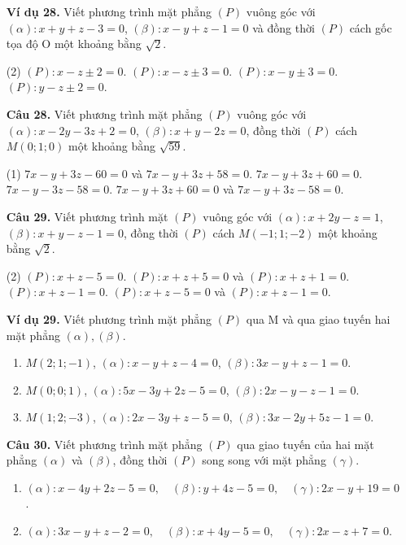 \documentclass[12pt, a4paper]{article}
\begin{document}
\begin{enumerate}[label=\textbf{\arabic*.}, wide=0pt, leftmargin=*]
    \item[\textbf{Ví dụ 28.}] Viết phương trình mặt phẳng \((P)\) vuông góc với \((\alpha): x+y+z-3=0\), \((\beta): x-y+z-1=0\) và đồng thời \((P)\) cách gốc tọa độ O một khoảng bằng \(\sqrt{2}\).
    \begin{tasks}(2)
        \task \((P): x-z \pm 2 = 0\).
        \task \((P): x-z \pm 3 = 0\).
        \task \((P): x-y \pm 3 = 0\).
        \task \((P): y-z \pm 2 = 0\).
    \end{tasks}
    
    \item[\textbf{Câu 28.}] Viết phương trình mặt phẳng \((P)\) vuông góc với \((\alpha): x-2y-3z+2=0\), \((\beta): x+y-2z=0\), đồng thời \((P)\) cách \(M(0;1;0)\) một khoảng bằng \(\sqrt{59}\).
    \begin{tasks}[label-width=1.5em](1)
        \task \(7x-y+3z-60=0\) và \(7x-y+3z+58=0\).
        \task \(7x-y+3z+60=0\).
        \task \(7x-y-3z-58=0\).
        \task \(7x-y+3z+60=0\) và \(7x-y+3z-58=0\).
    \end{tasks}
    
    
    \item[\textbf{Câu 29.}] Viết phương trình mặt \((P)\) vuông góc với \((\alpha): x+2y-z=1\), \((\beta): x+y-z-1=0\), đồng thời \((P)\) cách \(M(-1;1;-2)\) một khoảng bằng \(\sqrt{2}\).
    \begin{tasks}(2)
        \task \((P): x+z-5=0\).
        \task \((P): x+z+5=0\) và \((P): x+z+1=0\).
        \task \((P): x+z-1=0\).
        \task \((P): x+z-5=0\) và \((P): x+z-1=0\).
    \end{tasks}

    \item[\textbf{Ví dụ 29.}] Viết phương trình mặt phẳng \((P)\) qua M và qua giao tuyến hai mặt phẳng \((\alpha), (\beta)\).
    \begin{enumerate}[label=a*)]
        \item \(M(2;1;-1)\), \((\alpha): x-y+z-4=0\), \((\beta): 3x-y+z-1=0\).
        \item \(M(0;0;1)\), \((\alpha): 5x-3y+2z-5=0\), \((\beta): 2x-y-z-1=0\).
        \item \(M(1;2;-3)\), \((\alpha): 2x-3y+z-5=0\), \((\beta): 3x-2y+5z-1=0\).
    \end{enumerate}

    \item[\textbf{Câu 30.}] Viết phương trình mặt phẳng \((P)\) qua giao tuyến của hai mặt phẳng \((\alpha)\) và \((\beta)\), đồng thời \((P)\) song song với mặt phẳng \((\gamma)\).
    \begin{enumerate}[label=a*)]
        \item \((\alpha): x-4y+2z-5=0, \quad (\beta): y+4z-5=0, \quad (\gamma): 2x-y+19=0\).
        \item \((\alpha): 3x-y+z-2=0, \quad (\beta): x+4y-5=0, \quad (\gamma): 2x-z+7=0\).
    \end{enumerate}


\end{enumerate}
\end{document}

